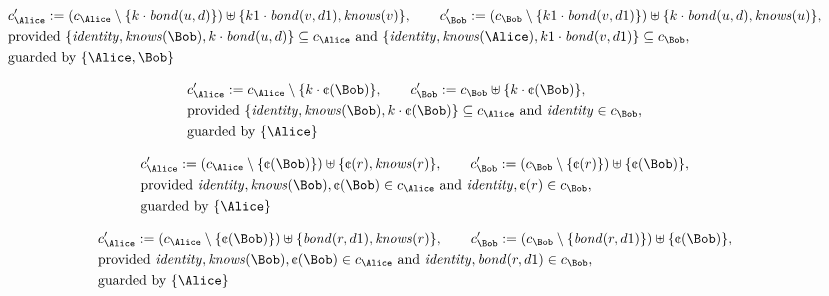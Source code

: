 \begin{align*}
&
c'_
{
\Alice
}
 := 
(c_
{
\Alice
}
 \setminus 
\{
k
\cdot
\mathit{
bond
}
(
u
,
d
)
\}
) \uplus 
\{
k1
\cdot
\mathit{
bond
}
(
v
,
d1
)
,
\mathit{
knows
}
(
v
)
\}
, \qquad 
c'_
{
\Bob
}
 := 
(c_
{
\Bob
}
 \setminus 
\{
k1
\cdot
\mathit{
bond
}
(
v
,
d1
)
\}
) \uplus 
\{
k
\cdot
\mathit{
bond
}
(
u
,
d
)
,
\mathit{
knows
}
(
u
)
\}
,\\
&
\text{provided } 
\{
\mathit{
identity
}
,
\mathit{
knows
}
(
\Bob
)
,
k
\cdot
\mathit{
bond
}
(
u
,
d
)
\}
 \subseteq c_
{
\Alice
}
 \text{ and } 
\{
\mathit{
identity
}
,
\mathit{
knows
}
(
\Alice
)
,
k1
\cdot
\mathit{
bond
}
(
v
,
d1
)
\}
 \subseteq c_
{
\Bob
}
,\\
&
\text{guarded by } \{
\Alice
,
\Bob
\}
\end{align*}

\begin{align*}
&
c'_
{
\Alice
}
 := 
c_
{
\Alice
}
 \setminus 
\{
k
\cdot
\text{\textcent}
(
\Bob
)
\}
, \qquad 
c'_
{
\Bob
}
 := 
c_
{
\Bob
}
 \uplus 
\{
k
\cdot
\text{\textcent}
(
\Bob
)
\}
,\\
&
\text{provided } 
\{
\mathit{
identity
}
,
\mathit{
knows
}
(
\Bob
)
,
k
\cdot
\text{\textcent}
(
\Bob
)
\}
 \subseteq c_
{
\Alice
}
 \text{ and } 
\mathit{
identity
}
 \in c_
{
\Bob
}
,\\
&
\text{guarded by } \{
\Alice
\}
\end{align*}

\begin{align*}
&
c'_
{
\Alice
}
 := 
(c_
{
\Alice
}
 \setminus 
\{
\text{\textcent}
(
\Bob
)
\}
) \uplus 
\{
\text{\textcent}
(
r
)
,
\mathit{
knows
}
(
r
)
\}
, \qquad 
c'_
{
\Bob
}
 := 
(c_
{
\Bob
}
 \setminus 
\{
\text{\textcent}
(
r
)
\}
) \uplus 
\{
\text{\textcent}
(
\Bob
)
\}
,\\
&
\text{provided } 
\mathit{
identity
}
,
\mathit{
knows
}
(
\Bob
)
,
\text{\textcent}
(
\Bob
)
 \in c_
{
\Alice
}
 \text{ and } 
\mathit{
identity
}
,
\text{\textcent}
(
r
)
 \in c_
{
\Bob
}
,\\
&
\text{guarded by } \{
\Alice
\}
\end{align*}

\begin{align*}
&
c'_
{
\Alice
}
 := 
(c_
{
\Alice
}
 \setminus 
\{
\text{\textcent}
(
\Bob
)
\}
) \uplus 
\{
\mathit{
bond
}
(
r
,
d1
)
,
\mathit{
knows
}
(
r
)
\}
, \qquad 
c'_
{
\Bob
}
 := 
(c_
{
\Bob
}
 \setminus 
\{
\mathit{
bond
}
(
r
,
d1
)
\}
) \uplus 
\{
\text{\textcent}
(
\Bob
)
\}
,\\
&
\text{provided } 
\mathit{
identity
}
,
\mathit{
knows
}
(
\Bob
)
,
\text{\textcent}
(
\Bob
)
 \in c_
{
\Alice
}
 \text{ and } 
\mathit{
identity
}
,
\mathit{
bond
}
(
r
,
d1
)
 \in c_
{
\Bob
}
,\\
&
\text{guarded by } \{
\Alice
\}
\end{align*}
